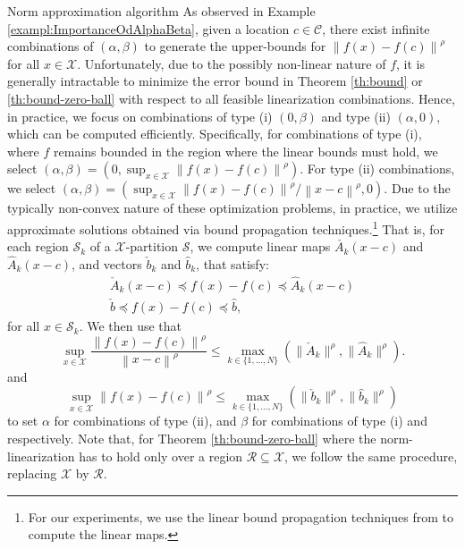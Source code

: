 \documentclass[11pt, a4paper, oneside,reqno]{amsart}
\makeatletter
\def\subsection{\@startsection{subsection}{2}%
	\z@{.5\linespacing\@plus.7\linespacing}{.5\linespacing}%
	{\normalfont\bfseries}}
\theoremstyle{plain}
\newcommand{\norm}[1]{\left\lVert#1\right\rVert}
\def\sR{{\mathcal{R}}}
\def\sS{{\mathcal{S}}}
\def\sX{{\mathcal{X}}}
\def\bsC{{\bm{\mathcal{C}}}}
\def\bsS{{\bm{\mathcal{S}}}}
\def\mA{{{A}}}
\def\vb{{{b}}}
\def\vx{{{x}}}
\makeatother
\begin{document}
\subsection{Norm approximation algorithm}\label{subsection:approx-algo}
As observed in Example \ref{exampl:ImportanceOdAlphaBeta}, given a location $c \in \bsC$, there exist infinite combinations of $(\alpha, \beta)$ to generate the upper-bounds for $\norm{f(x)-f(c)}^\rho$ for all $x \in \sX$. 
Unfortunately, due to the possibly non-linear nature of \(f\), it is generally intractable to minimize the error bound in Theorem \ref{th:bound} or \ref{th:bound-zero-ball} with respect to all feasible linearization combinations. 
Hence, in practice, we 
focus on combinations of type (i) \((0, \beta)\) and type (ii) \((\alpha, 0)\), which can be computed efficiently.
Specifically, for combinations of type (i), where $f$ remains bounded in the region where the linear bounds must hold, we select $(\alpha, \beta) = (0,\sup_{x\in\sX} \norm{f(x)-f(c)}^\rho)$.
For type (ii) combinations, we select \((\alpha,\beta)=(\sup_{x\in \sX} \norm{f(x)-f(c)}^\rho/\norm{x-c}^\rho, 0)\). Due to the typically non-convex nature of these optimization problems, in practice, we utilize approximate solutions obtained via bound propagation techniques.\footnote{For our experiments, we use the linear bound propagation techniques from \cite{mathiesen2022safety} to compute the linear maps.} 
That is, for each region \(\sS_k\) of a $\sX$-partition $\bsS$, we compute 
linear maps \(\check{\mA_k}(\vx-c)\) and \(\hat{\mA}_k(\vx-c)\), 
and vectors \(\check{\vb}_k\) and \(\hat{\vb}_k\),
that satisfy: 
\begin{gather}
    \check{\mA}_k(\vx-c) \preceq f(\vx) - f(c) \preceq \hat{\mA}_k(\vx-c)\label{eq:linear-maps-condition}\\
    \check{\vb}\preceq f(\vx) - f(c) \preceq \hat{\vb}, 
\end{gather}
for all \(\vx\in\sS_k\). We then use that
\begin{equation}\label{eq:heuristics-for-alpha}
    \sup_{x\in \sX}\frac{\norm{f(x)-f(c)}^\rho}{\norm{x-c}^\rho} \leq 
    \max_{k \in \{1,...,N\}}\left(\|\check{\mA}_k\|^\rho,\|\hat{\mA}_k\|^\rho\right).
\end{equation}
and
\begin{equation}\label{eq:heuristics-for-beta}
    \sup_{x\in\sX} \norm{f(x)-f(c)}^\rho \leq \max_{k \in \{1,...,N\}}\left(\|\check{\vb}_k\|^\rho,\|\hat{\vb}_k\|^\rho\right)
\end{equation} 
to set \(\alpha\) for combinations of type (ii), and \(\beta\) for combinations of type (i) and respectively. Note that, for Theorem \ref{th:bound-zero-ball} where the norm-linearization has to hold only over a region \(\sR\subseteq\sX\), we follow the same procedure, replacing \(\sX\) by \(\sR\).
\end{document}
